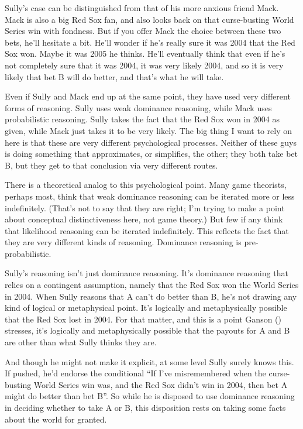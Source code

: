 \documentclass[
  10pt,
  letterpaper,
  twoside]{scrbook}
\begin{document}
Sully's case can be distinguished from that of his more anxious friend
Mack. Mack is also a big Red Sox fan, and also looks back on that
curse-busting World Series win with fondness. But if you offer Mack the
choice between these two bets, he'll hesitate a bit. He'll wonder if
he's really sure it was 2004 that the Red Sox won. Maybe it was 2005 he
thinks. He'll eventually think that even if he's not completely sure
that it was 2004, it was very likely 2004, and so it is very likely that
bet B will do better, and that's what he will take.

Even if Sully and Mack end up at the same point, they have used very
different forms of reasoning. Sully uses weak dominance reasoning, while
Mack uses probabilistic reasoning. Sully takes the fact that the Red Sox
won in 2004 as given, while Mack just takes it to be very likely. The
big thing I want to rely on here is that these are very different
psychological processes. Neither of these guys is doing something that
approximates, or simplifies, the other; they both take bet B, but they
get to that conclusion via very different routes.

There is a theoretical analog to this psychological point. Many game
theorists, perhaps most, think that weak dominance reasoning can be
iterated more or less indefinitely. (That's not to say that they are
right; I'm trying to make a point about conceptual distinctiveness here,
not game theory.) But few if any think that likelihood reasoning can be
iterated indefinitely. This reflects the fact that they are very
different kinds of reasoning. Dominance reasoning is pre-probabilistic.

Sully's reasoning isn't just dominance reasoning. It's dominance
reasoning that relies on a contingent assumption, namely that the Red
Sox won the World Series in 2004. When Sully reasons that A can't do
better than B, he's not drawing any kind of logical or metaphysical
point. It's logically and metaphysically possible that the Red Sox lost
in 2004. For that matter, and this is a point Ganson
() stresses, it's logically and
metaphysically possible that the payouts for A and B are other than what
Sully thinks they are.

And though he might not make it explicit, at some level Sully surely
knows this. If pushed, he'd endorse the conditional ``If I've
misremembered when the curse-busting World Series win was, and the Red
Sox didn't win in 2004, then bet A might do better than bet B''. So
while he is disposed to use dominance reasoning in deciding whether to
take A or B, this disposition rests on taking some facts about the world
for granted.
\end{document}
